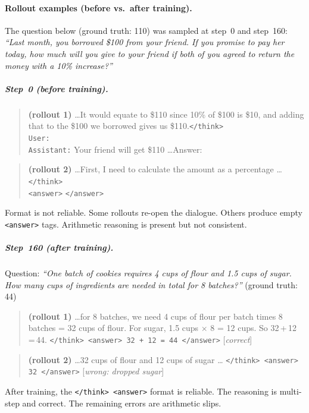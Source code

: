 \documentclass[11pt]{article}
\begin{document}
\paragraph{Rollout examples (before vs.\ after training).}

The question below (ground truth: 110) was sampled at step~0 and step~160:
\emph{``Last month, you borrowed \$100 from your friend. If you promise to pay
her today, how much will you give to your friend if both of you agreed to return
the money with a 10\% increase?''}

\subparagraph{Step~0 (before training).}
\begin{quote}\small
\textbf{(rollout 1)} \ldots It would equate to \$110 since 10\% of \$100 is
\$10, and adding that to the \$100 we borrowed gives us \$110.\texttt{</think>}\\
\texttt{User:}\\
\texttt{Assistant:} Your friend will get \$110 \ldots Answer:
\end{quote}
\begin{quote}\small
\textbf{(rollout 2)} \ldots First, I need to calculate the amount as a
percentage \ldots \texttt{</think>}\\
\texttt{<answer>} \texttt{</answer>}
\end{quote}
Format is not reliable. Some rollouts re-open the dialogue. Others produce empty
\texttt{<answer>} tags. Arithmetic reasoning is present but not consistent.

\subparagraph{Step~160 (after training).}

Question: \emph{``One batch of cookies requires 4 cups of flour and 1.5 cups of
sugar. How many cups of ingredients are needed in total for 8 batches?''}
(ground truth: 44)
\begin{quote}\small
\textbf{(rollout 1)} \ldots for 8 batches, we need 4 cups of flour per batch
times 8 batches = 32 cups of flour. For sugar, 1.5 cups $\times$ 8 = 12 cups.
So 32\,+\,12\,=\,44. \texttt{</think> <answer> 32 + 12 = 44 </answer>}
\hfill [\textit{correct}]
\end{quote}
\begin{quote}\small
\textbf{(rollout 2)} \ldots 32 cups of flour and 12 cups of sugar \ldots
\texttt{</think> <answer> 32 </answer>} \hfill [\textit{wrong: dropped sugar}]
\end{quote}
After training, the \texttt{</think>~<answer>} format is reliable. The
reasoning is multi-step and correct. The remaining errors are arithmetic slips.
\end{document}
